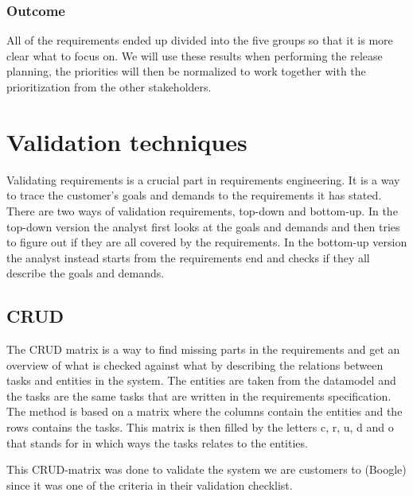\documentclass[a4paper]{article}
\begin{document}
		\subsubsection{Outcome}
			All of the requirements ended up divided into the five groups so that it is more clear what to focus on. We will use these results when performing the release planning, the priorities will then be normalized to work together with the prioritization from the other stakeholders.

	\section{Validation techniques}
	Validating requirements is a crucial part in requirements engineering. It is a way to trace the customer's goals and demands to the requirements it has stated. There are two ways of validation requirements, top-down and bottom-up. In the top-down version the analyst first looks at the goals and demands and then tries to figure out if they are all covered by the requirements. In the bottom-up version the analyst instead starts from the requirements end and checks if they all describe the goals and demands.
						
			\subsection{CRUD}
				The CRUD matrix is a way to find missing parts in the requirements and get an overview of what is checked against what by describing the relations between tasks and entities in the system. The entities are taken from the datamodel and the tasks are the same tasks that are written in the requirements specification. The method is based on a matrix where the columns contain the entities and the rows contains the tasks. This matrix is then filled by the letters c, r, u, d and o that stands for in which ways the tasks relates to the entities. 
				
				This CRUD-matrix was done to validate the system we are customers to (Boogle) since it was one of the criteria in their validation checklist.
			
\end{document}
